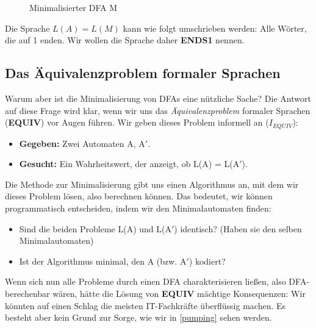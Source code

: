 \begin{figure}[ht] %
\centering %
\caption{Minimalisierter DFA M}
\label{fig:mindfa}
\end{figure}

Die Sprache $L(A) = L(M)$ kann wie folgt umschrieben werden:
Alle Wörter, die auf 1 enden.
Wir wollen die Sprache daher \textbf{ENDS1} nennen.

\subsection{Das Äquivalenzproblem formaler Sprachen}

Warum aber ist die Minimalisierung von DFAs eine nützliche Sache? 
Die Antwort auf diese Frage wird klar,
wenn wir uns das \emph{Äquivalenzproblem} formaler Sprachen (\textbf{EQUIV})
vor Augen führen.
Wir geben dieses Problem informell an ($I_{EQUIV}$):
\begin{itemize}
    \item \textbf{Gegeben:} Zwei Automaten A, A$'$.
    \item \textbf{Gesucht:} Ein Wahrheitswert, der anzeigt, ob L(A) = L(A$'$).
\end{itemize}
Die Methode zur Minimalisierung gibt uns einen Algorithmus an,
mit dem wir dieses Problem lösen, also berechnen können.
Das bedeutet, wir können programmatisch entscheiden,
indem wir den Minimalautomaten finden:
\begin{itemize}
    \item Sind die beiden Probleme L(A) und L(A$'$) identisch?
        (Haben sie den selben Minimalautomaten)
    \item Ist der Algorithmus minimal, den A (bzw. A$'$) kodiert?
\end{itemize}

Wenn sich nun alle Probleme durch einen DFA charakterisieren ließen,
also DFA-berechenbar wären,
hätte die Lösung von \textbf{EQUIV} mächtige Konsequenzen:
Wir könnten auf einen Schlag die meisten IT-Fachkräfte überflüssig machen.
Es besteht aber kein Grund zur Sorge, wie wir in \autoref{pumping} sehen werden.

